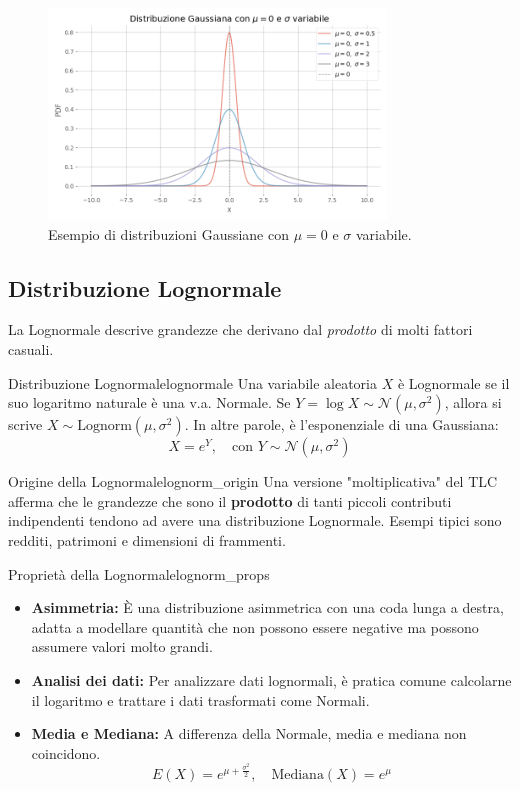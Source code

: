 \begin{figure}[H]
    \centering
    \includegraphics[width=0.8\textwidth]{images/th_01_03/gaussiana.png}
    \caption{Esempio di distribuzioni Gaussiane con \(\mu=0\) e \(\sigma\) variabile.}
    \label{fig:gaussiana}
\end{figure}

\subsection{Distribuzione Lognormale}
La Lognormale descrive grandezze che derivano dal \emph{prodotto} di molti fattori casuali.

\begin{definizione}{Distribuzione Lognormale}{lognormale}
Una variabile aleatoria \(X\) è Lognormale se il suo logaritmo naturale è una v.a. Normale. Se \(Y = \log X \sim \mathcal{N}(\mu, \sigma^2)\), allora si scrive \(X \sim \text{Lognorm}(\mu, \sigma^2)\). In altre parole, è l'esponenziale di una Gaussiana:
\[ X = e^Y, \quad \text{con } Y \sim \mathcal{N}(\mu, \sigma^2) \]
\end{definizione}

\begin{nota}{Origine della Lognormale}{lognorm_origin}
Una versione "moltiplicativa" del TLC afferma che le grandezze che sono il \textbf{prodotto} di tanti piccoli contributi indipendenti tendono ad avere una distribuzione Lognormale. Esempi tipici sono redditi, patrimoni e dimensioni di frammenti.
\end{nota}

\begin{proposizione}{Proprietà della Lognormale}{lognorm_props}
\begin{itemize}
    \item \textbf{Asimmetria:} È una distribuzione asimmetrica con una coda lunga a destra, adatta a modellare quantità che non possono essere negative ma possono assumere valori molto grandi.
    \item \textbf{Analisi dei dati:} Per analizzare dati lognormali, è pratica comune calcolarne il logaritmo e trattare i dati trasformati come Normali.
    \item \textbf{Media e Mediana:} A differenza della Normale, media e mediana non coincidono.
    \[ E(X) = e^{\mu + \frac{\sigma^2}{2}}, \quad \text{Mediana}(X) = e^\mu \]
\end{itemize}
\end{proposizione}

